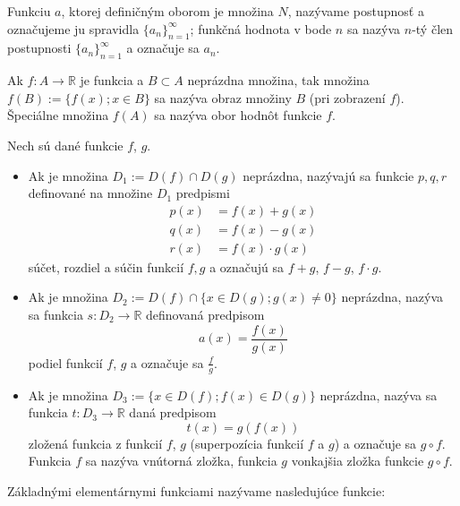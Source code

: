 Funkciu $a$, ktorej definičným oborom je množina $N$, nazývame postupnosť a
označujeme ju spravidla $\{a_n\}_{n=1}^\infty$; funkčná hodnota v bode $n$ sa
nazýva $n$-tý člen postupnosti $\{a_n\}_{n=1}^\infty$ a označuje sa $a_n$.

Ak $f:A \rightarrow \mathbb{R}$ je funkcia a $B \subset A$ neprázdna množina,
tak množina $f(B):=\{f(x);x\in B \}$ sa nazýva obraz množiny $B$ (pri zobrazení
$f$). Špeciálne množina $f(A)$ sa nazýva obor hodnôt funkcie $f$.

Nech sú dané funkcie $f$, $g$.

\begin{itemize}
  \item
    Ak je množina $D_1:=D(f)\cap D(g)$ neprázdna, nazývajú sa funkcie $p, q, r$
    definované na množine $D_1$ predpismi
    \begin{align*}
      p(x) &= f(x)+g(x) \\
      q(x) &= f(x)-g(x) \\
      r(x) &= f(x)\cdot g(x)
    \end{align*}
    súčet, rozdiel a súčin funkcií $f, g$ a označujú sa $f+g$, $f-g$, $f\cdot g$.
  \item
    Ak je množina $D_2:=D(f)\cap \{x\in D(g);g(x)\neq 0\}$ neprázdna, nazýva sa
    funkcia $s:D_2 \rightarrow \mathbb{R}$ definovaná predpisom
    \[
      a(x)=\frac{f(x)}{g(x)}
    \]
    podiel funkcií $f$, $g$ a označuje sa $\frac{f}{g}$.
  \item
    Ak je množina $D_3:=\{x\in D(f);f(x)\in D(g)\}$ neprázdna, nazýva sa funkcia
    $t:D_3\rightarrow\mathbb{R}$ daná predpisom
    $$t(x)=g(f(x))$$
    zložená funkcia z funkcií $f$, $g$ (superpozícia funkcií $f$ a $g$) a označuje
    sa $g \circ f$. Funkcia $f$ sa nazýva vnútorná zložka, funkcia $g$ vonkajšia
    zložka funkcie $g \circ f$.
\end{itemize}

Základnými elementárnymi funkciami nazývame nasledujúce funkcie:

